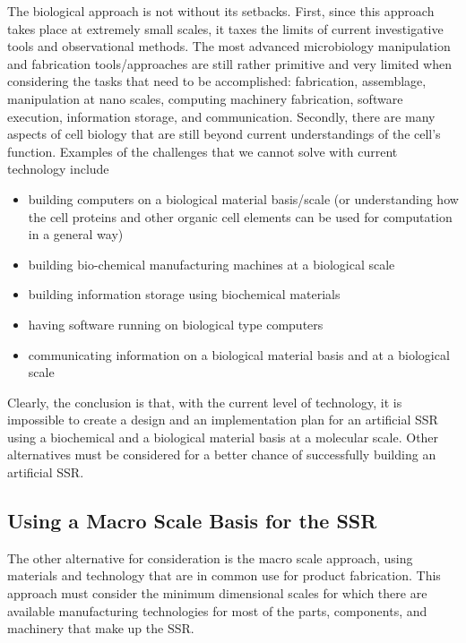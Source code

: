 The biological approach is not without its setbacks. First, since this approach takes place at extremely small scales, it taxes the limits of current investigative tools and observational methods. The most advanced microbiology manipulation and fabrication tools/approaches are still rather primitive and very limited when considering the tasks that need to be accomplished: fabrication, assemblage, manipulation at nano scales, computing machinery fabrication, software execution, information storage, and communication. Secondly, there are many aspects of cell biology that are still beyond current understandings of the cell’s function.  Examples of the challenges that we cannot solve with current technology include

\begin{itemize}
\item building computers on a biological material basis/scale (or
understanding how the cell proteins and other organic cell elements can
be used for computation in a general way)
\item building bio-chemical manufacturing machines at a biological
scale
\item building information storage using biochemical materials
\item having software running on biological type computers
\item communicating information on a biological material basis and at a biological scale
\end{itemize}

Clearly, the conclusion is that, with the current level of
technology, it is impossible to create a design and an implementation
plan for an artificial SSR using a biochemical and a biological material
basis at a molecular scale. Other alternatives must be considered for a better
chance of successfully building an artificial SSR.

\subsection{Using a Macro Scale Basis for the SSR}

The other alternative for consideration is the macro scale approach, using materials
and technology that are in common use for product fabrication.
This approach must consider the minimum
dimensional scales for which there are available manufacturing
technologies for most of the parts, components, and machinery that make
up the SSR.  

